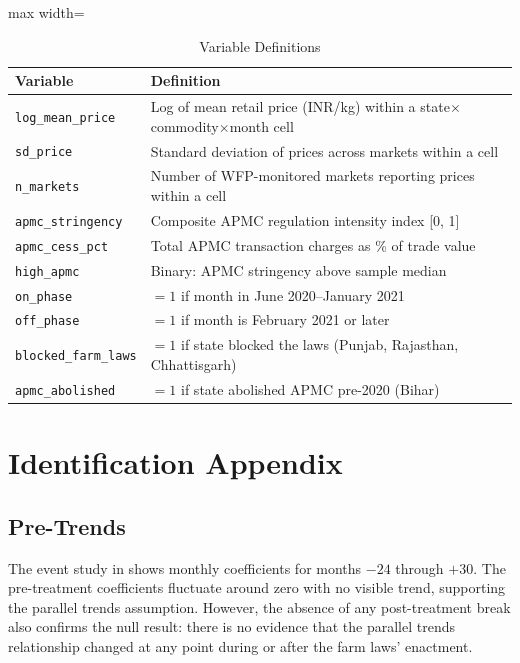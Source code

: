 \documentclass[12pt]{article}
\begin{document}
\begin{table}[H]
\centering
\caption{Variable Definitions}
\begin{adjustbox}{max width=\textwidth}
\begin{tabular}{lp{10cm}}
\toprule
Variable & Definition \\
\midrule
\texttt{log\_mean\_price} & Log of mean retail price (INR/kg) within a state$\times$commodity$\times$month cell \\
\texttt{sd\_price} & Standard deviation of prices across markets within a cell \\
\texttt{n\_markets} & Number of WFP-monitored markets reporting prices within a cell \\
\texttt{apmc\_stringency} & Composite APMC regulation intensity index [0, 1] \\
\texttt{apmc\_cess\_pct} & Total APMC transaction charges as \% of trade value \\
\texttt{high\_apmc} & Binary: APMC stringency above sample median \\
\texttt{on\_phase} & $= 1$ if month in June 2020--January 2021 \\
\texttt{off\_phase} & $= 1$ if month is February 2021 or later \\
\texttt{blocked\_farm\_laws} & $= 1$ if state blocked the laws (Punjab, Rajasthan, Chhattisgarh) \\
\texttt{apmc\_abolished} & $= 1$ if state abolished APMC pre-2020 (Bihar) \\
\bottomrule
\end{tabular}
\end{adjustbox}
\end{table}


\section{Identification Appendix}
\label{app:identification}

\subsection{Pre-Trends}

The event study in  shows monthly coefficients for months $-24$ through $+30$. The pre-treatment coefficients fluctuate around zero with no visible trend, supporting the parallel trends assumption. However, the absence of any post-treatment break also confirms the null result: there is no evidence that the parallel trends relationship changed at any point during or after the farm laws' enactment.
\end{document}
